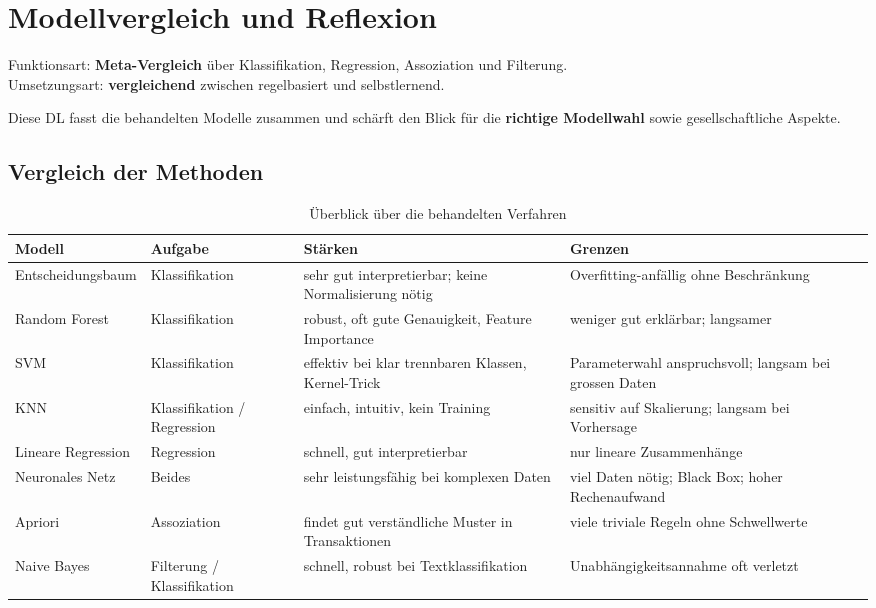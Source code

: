 \chapter{Modellvergleich und Reflexion}
\label{chap:modellvergleich}

\begin{myremark}
Funktionsart: \textbf{Meta-Vergleich} über Klassifikation, Regression, Assoziation und Filterung. \\
Umsetzungsart: \textbf{vergleichend} zwischen regelbasiert und selbstlernend.
\end{myremark}

\begin{myremark}
Diese DL fasst die behandelten Modelle zusammen und schärft den Blick für
die \textbf{richtige Modellwahl} sowie gesellschaftliche Aspekte.
\end{myremark}

\section{Vergleich der Methoden}

\begin{table}[H]
\centering
\small
\begin{tabular}{p{2.8cm}p{2.1cm}p{3.5cm}p{3.5cm}}
\toprule
\textbf{Modell} & \textbf{Aufgabe} & \textbf{Stärken} & \textbf{Grenzen} \\
\midrule
Entscheidungsbaum & Klassifikation & sehr gut interpretierbar; keine Normalisierung nötig & Overfitting-anfällig ohne Beschränkung \\
\midrule
Random Forest & Klassifikation & robust, oft gute Genauigkeit, Feature Importance & weniger gut erklärbar; langsamer \\
\midrule
SVM & Klassifikation & effektiv bei klar trennbaren Klassen, Kernel-Trick & Parameterwahl anspruchsvoll; langsam bei grossen Daten \\
\midrule
KNN & Klassifikation / Regression & einfach, intuitiv, kein Training & sensitiv auf Skalierung; langsam bei Vorhersage \\
\midrule
Lineare Regression & Regression & schnell, gut interpretierbar & nur lineare Zusammenhänge \\
\midrule
Neuronales Netz & Beides & sehr leistungsfähig bei komplexen Daten & viel Daten nötig; Black Box; hoher Rechenaufwand \\
\midrule
Apriori & Assoziation & findet gut verständliche Muster in Transaktionen & viele triviale Regeln ohne Schwellwerte \\
\midrule
Naive Bayes & Filterung / Klassifikation & schnell, robust bei Textklassifikation & Unabhängigkeitsannahme oft verletzt \\
\bottomrule
\end{tabular}
\caption{Überblick über die behandelten Verfahren}
\label{tab:modellvergleich-15}
\end{table}

